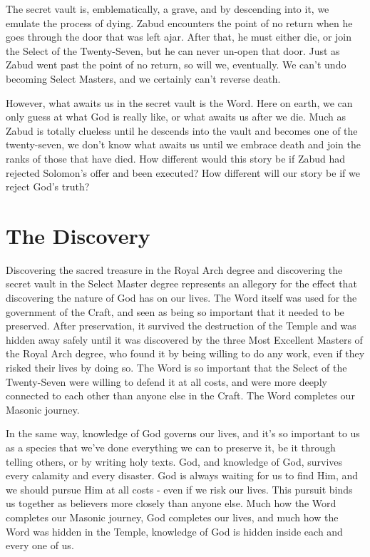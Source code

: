 \documentclass[letterpaper,11pt]{article}
\begin{document}
	The secret vault is, emblematically, a grave, and by descending into it, we emulate the process of dying. Zabud encounters the point of no return when he goes through the door that was left ajar. After that, he must either die, or join the Select of the Twenty-Seven, but he can never un-open that door. Just as Zabud went past the point of no return, so will we, eventually. We can't undo becoming Select Masters, and we certainly can't reverse death.
	
	However, what awaits us in the secret vault is the Word. Here on earth, we can only guess at what God is really like, or what awaits us after we die. Much as Zabud is totally clueless until he descends into the vault and becomes one of the twenty-seven, we don't know what awaits us until we embrace death and join the ranks of those that have died. How different would this story be if Zabud had rejected Solomon's offer and been executed? How different will our story be if we reject God's truth?
	
	\section*{The Discovery}
	
	Discovering the sacred treasure in the Royal Arch degree and discovering the secret vault in the Select Master degree represents an allegory for the effect that discovering the nature of God has on our lives. The Word itself was used for the government of the Craft, and seen as being so important that it needed to be preserved. After preservation, it survived the destruction of the Temple and was hidden away safely until it was discovered by the three Most Excellent Masters of the Royal Arch degree, who found it by being willing to do any work, even if they risked their lives by doing so. The Word is so important that the Select of the Twenty-Seven were willing to defend it at all costs, and were more deeply connected to each other than anyone else in the Craft. The Word completes our Masonic journey.
	
	In the same way, knowledge of God governs our lives, and it's so important to us as a species that we've done everything we can to preserve it, be it through telling others, or by writing holy texts. God, and knowledge of God, survives every calamity and every disaster. God is always waiting for us to find Him, and we should pursue Him at all costs - even if we risk our lives. This pursuit binds us together as believers more closely than anyone else. Much how the Word completes our Masonic journey, God completes our lives, and much how the Word was hidden in the Temple, knowledge of God is hidden inside each and every one of us.
	
\end{document}
